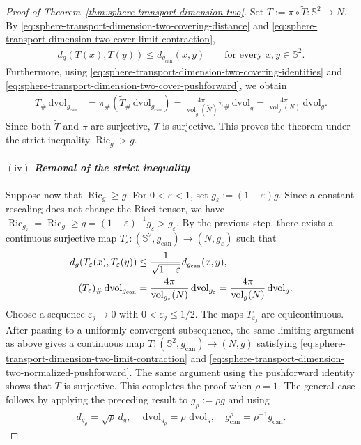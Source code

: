 \documentclass[11pt,reqno]{amsart}
\numberwithin{equation}{section}
\theoremstyle{definition}
\theoremstyle{remark}
\def\bS {\mathbb{S}}
\newcommand{\0}{\emptyset}
\newcommand{\veps}{\varepsilon}
\newcommand{\Ric}{\operatorname{Ric}}
\newcommand{\can}{\mathrm{can}}
\newcommand{\vol}{\operatorname{vol}}
\newcommand{\dvol}{\,\mathrm{dvol}}
\begin{document}
\begin{proof}[Proof of Theorem~\ref{thm:sphere-transport-dimension-two}]
Set $T:=\pi\circ\widetilde T:\bS^2\to N$. By
\eqref{eq:sphere-transport-dimension-two-covering-distance} and
\eqref{eq:sphere-transport-dimension-two-cover-limit-contraction},
\begin{align}\label{eq:sphere-transport-dimension-two-limit-contraction}
        d_g(T(x),T(y))
        \leq
        d_{g_{\can}}(x,y)
        \qquad
        \text{for every }x,y\in\bS^2.
\end{align}
Furthermore, using
\eqref{eq:sphere-transport-dimension-two-covering-identities} and
\eqref{eq:sphere-transport-dimension-two-cover-pushforward}, we obtain
\begin{align}\label{eq:sphere-transport-dimension-two-normalized-pushforward}
        T_\#\dvol_{g_{\can}}
        &=
        \pi_\#\left(
        \widetilde T_\#\dvol_{g_{\can}}
        \right)
        =
        \frac{4\pi}{\vol_{\widetilde g}(\widetilde N)}
        \pi_\#\dvol_{\widetilde g}
        =
        \frac{4\pi}{\vol_g(N)}\dvol_g.
\end{align}
Since both $\widetilde T$ and $\pi$ are surjective, $T$ is surjective. This
proves the theorem under the strict inequality $\Ric_g>g$.

\paragraph{$\mathrm{(iv)}$ \textit{Removal of the strict inequality}}
Suppose now that $\Ric_g\geq g$. For $0<\veps<1$, set
$g_\veps:=(1-\veps)g$. Since a constant rescaling does not change the Ricci
tensor, we have $\Ric_{g_\veps}=\Ric_g\geq g=(1-\veps)^{-1}g_\veps>g_\veps$. By the
previous step, there exists a continuous surjective map
$T_\veps:(\bS^2,g_{\can})\to(N,g_\veps)$ such that
\begin{align}
        d_g(T_\veps(x),T_\veps(y))
        &\leq
        \frac{1}{\sqrt{1-\veps}}d_{g_{\can}}(x,y),
        \notag\\
        (T_\veps)_\#\dvol_{g_{\can}}
        &=
        \frac{4\pi}{\vol_{g_\veps}(N)}\dvol_{g_\veps}
        =
        \frac{4\pi}{\vol_g(N)}\dvol_g.
\end{align}
Choose a sequence $\veps_j\to0$ with $0<\veps_j\leq1/2$. The maps $T_{\veps_j}$ are equicontinuous. After passing to a uniformly convergent subsequence, the same
limiting argument as above gives a continuous map
$T:(\bS^2,g_{\can})\to(N,g)$ satisfying
\eqref{eq:sphere-transport-dimension-two-limit-contraction} and
\eqref{eq:sphere-transport-dimension-two-normalized-pushforward}. The same
argument using the pushforward identity shows that $T$ is surjective. This completes the proof when $\rho=1$. The general case follows by applying the preceding result to $g_\rho:=\rho g$ and using
\begin{align}
        d_{g_\rho}
        =
        \sqrt{\rho}\,d_g,
        \quad
        \dvol_{g_\rho}
        =
        \rho\,\dvol_g,
        \quad
        g^\rho_{\can}
        =
        \rho^{-1}g_{\can}.
\end{align}
\end{proof}
\end{document}
